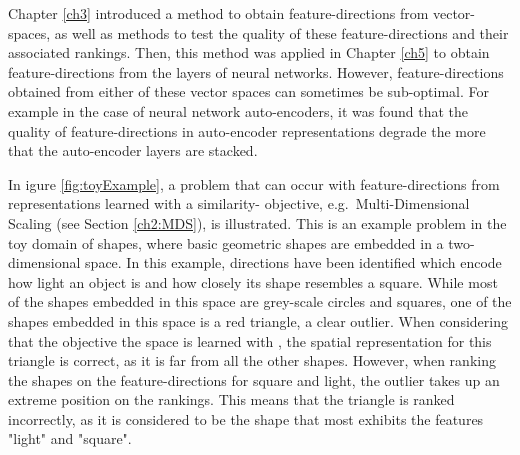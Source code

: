 
Chapter \ref{ch3} introduced a method to obtain  feature-directions from vector-spaces, as well as methods to test the quality of these feature-directions and their  associated  rankings. Then, this method was applied in Chapter \ref{ch5} to obtain feature-directions from the layers of neural networks. However, feature-directions obtained from either of these vector spaces can sometimes be sub-optimal. For example in the case of neural network auto-encoders, it was found that the quality of feature-directions in  auto-encoder representations degrade the more that the auto-encoder layers are stacked.  






 In igure \ref{fig:toyExample}, a problem that can occur with feature-directions from representations learned with a similarity- objective, e.g.\ Multi-Dimensional Scaling (see Section \ref{ch2:MDS}), is illustrated. This is an example problem in the toy domain of shapes, where  basic geometric shapes are embedded in a two-dimensional space. In this example, directions have been identified which encode how light an object is and how closely its shape resembles a square. While most of the shapes embedded in this space are grey-scale circles and squares, one of the shapes embedded in this space is a red triangle, a clear outlier. When considering that the objective the space is learned with , the spatial representation for this triangle  is correct,  as it is far from all the other shapes. However, when ranking the shapes on the feature-directions for square and light, the  outlier  takes up an extreme position on the rankings. This means that the triangle is ranked incorrectly, as it is considered to be the shape that most exhibits the features "light" and "square".

